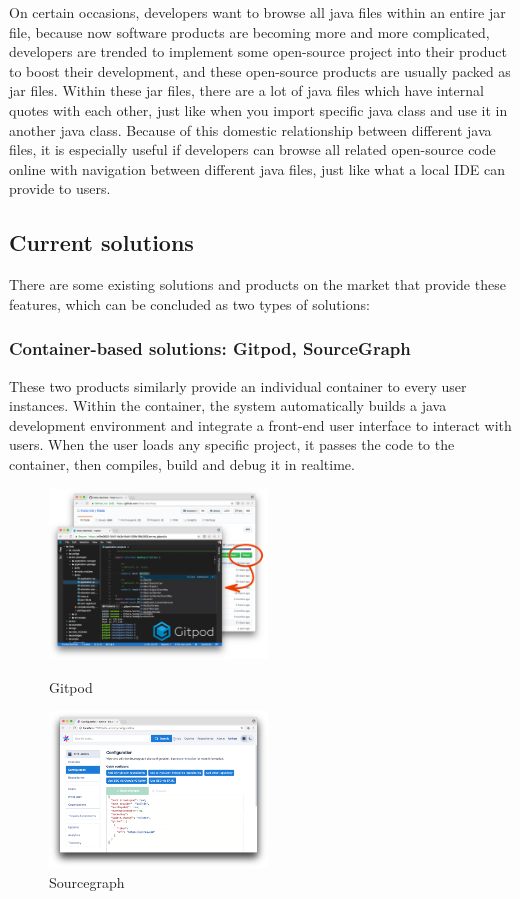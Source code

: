 \documentclass[runningheads]{llncs}
\begin{document}
On certain occasions, developers want to browse all java files within an entire jar file, because now software products are becoming more and more complicated, developers are trended to implement some open-source project into their product to boost their development, and these open-source products are usually packed as jar files. Within these jar files, there are a lot of java files which have internal quotes with each other, just like when you import specific java class and use it in another java class. Because of this domestic relationship between different java files, it is especially useful if developers can browse all related open-source code online with navigation between different java files, just like what a local IDE can provide to users.


\subsection{Current solutions}
There are some existing solutions and products on the market that provide these features, which can be concluded as two types of solutions:

\subsubsection{Container-based solutions: Gitpod\cite{Gitpod}, SourceGraph\cite{SourceGraph}}

These two products similarly provide an individual container to every user instances. Within the container, the system automatically builds a java development environment and integrate a front-end user interface to interact with users. When the user loads any specific project, it passes the code to the container, then compiles, build and debug it in realtime.

\begin{figure}[H]
	\centering
	\begin{minipage}[t]{0.48\textwidth}
	\centering
	\includegraphics[width=5.8cm]{pic/gitpod.png}
	\caption{Gitpod}
	\end{minipage}
	\begin{minipage}[t]{0.48\textwidth}
	\centering
	\includegraphics[width=5.8cm]{pic/sourcegraph.png}
	\caption{Sourcegraph}
	\end{minipage}
\end{figure}
\end{document}
